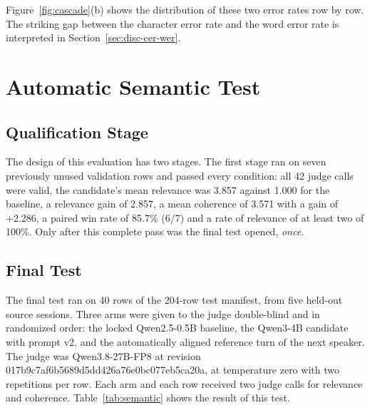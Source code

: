Figure~\ref{fig:cascade}(b) shows the distribution of these two error rates row by row.
The striking gap between the character error rate and the word error rate is
interpreted in Section~\ref{sec:disc-cer-wer}.


\section{Automatic Semantic Test}
\label{sec:res-semantic}

\subsection{Qualification Stage}

The design of this evaluation has two stages. The first stage ran on seven previously
unused validation rows and passed every condition: all 42 judge calls were valid, the
candidate's mean relevance was 3.857 against 1.000 for the baseline, a relevance gain of
2.857, a mean coherence of 3.571 with a gain of +2.286, a paired win rate of 85.7\% (6/7)
and a rate of relevance of at least two of 100\%. Only after this complete pass was the
final test opened, \emph{once}.

\subsection{Final Test}

The final test ran on 40 rows of the 204-row test manifest, from five held-out source
sessions. Three arms were given to the judge double-blind and in randomized order: the
locked Qwen2.5-0.5B baseline, the Qwen3-4B candidate with prompt v2, and the
automatically aligned reference turn of the next speaker. The judge was Qwen3.8-27B-FP8
at revision 017b9c7af6b5689d5dd426a76e0bc077eb5ca20a, at temperature zero with two
repetitions per row. Each arm and each row received two judge calls for relevance and
coherence. Table~\ref{tab:semantic} shows the result of this test.

